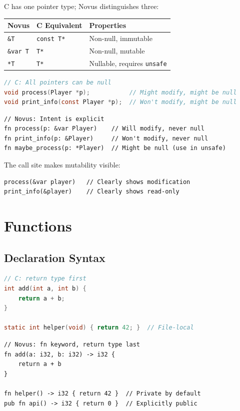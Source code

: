 C has one pointer type; Novus distinguishes three:

\begin{center}
\begin{tabular}{lll}
\textbf{Novus} & \textbf{C Equivalent} & \textbf{Properties} \\
\hline
\texttt{\&T} & \texttt{const T*} & Non-null, immutable \\
\texttt{\&var T} & \texttt{T*} & Non-null, mutable \\
\texttt{*T} & \texttt{T*} & Nullable, requires \texttt{unsafe} \\
\end{tabular}
\end{center}

\begin{lstlisting}[language=C]
// C: All pointers can be null
void process(Player *p);           // Might modify, might be null
void print_info(const Player *p);  // Won't modify, might be null
\end{lstlisting}

\begin{lstlisting}
// Novus: Intent is explicit
fn process(p: &var Player)    // Will modify, never null
fn print_info(p: &Player)     // Won't modify, never null
fn maybe_process(p: *Player)  // Might be null (use in unsafe)
\end{lstlisting}

The call site makes mutability visible:

\begin{lstlisting}
process(&var player)   // Clearly shows modification
print_info(&player)    // Clearly shows read-only
\end{lstlisting}

\section{Functions}

\subsection{Declaration Syntax}

\begin{lstlisting}[language=C]
// C: return type first
int add(int a, int b) {
    return a + b;
}

static int helper(void) { return 42; }  // File-local
\end{lstlisting}

\begin{lstlisting}
// Novus: fn keyword, return type last
fn add(a: i32, b: i32) -> i32 {
    return a + b
}

fn helper() -> i32 { return 42 }  // Private by default
pub fn api() -> i32 { return 0 }  // Explicitly public
\end{lstlisting}

